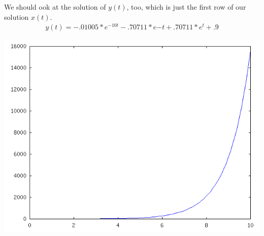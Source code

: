 \documentclass[11pt]{article}
\begin{document}
We should ook at the solution of $y(t)$, too, which is just
the first row of our solution $x(t)$.
\begin{align*}
    y(t) = -.01005*e^{-10t}-.70711*e{-t}+.70711*e^{t}+.9
\end{align*}

\begin{center}
\includegraphics[scale=0.5]{problem_19_17.png}
\end{center}
\end{document}
